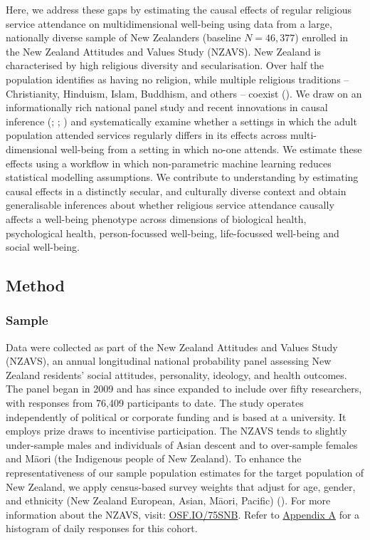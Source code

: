 \documentclass[
  single column]{article}
\begin{document}
Here, we address these gaps by estimating the causal effects of regular
religious service attendance on multidimensional well-being using data
from a large, nationally diverse sample of New Zealanders (baseline
\(N=46,377\)) enrolled in the New Zealand Attitudes and Values Study
(NZAVS). New Zealand is characterised by high religious diversity and
secularisation. Over half the population identifies as having no
religion, while multiple religious traditions -- Christianity, Hinduism,
Islam, Buddhism, and others -- coexist
(). We draw
on an informationally rich national panel study and recent innovations
in causal inference (;
;
) and systematically
examine whether a settings in which the adult population attended
services regularly differs in its effects across multi-dimensional
well-being from a setting in which no-one attends. We estimate these
effects using a workflow in which non-parametric machine learning
reduces statistical modelling assumptions. We contribute to
understanding by estimating causal effects in a distinctly secular, and
culturally diverse context and obtain generalisable inferences about
whether religious service attendance causally affects a well-being
phenotype across dimensions of biological health, psychological health,
person-focussed well-being, life-focussed well-being and social
well-being.

\subsection{Method}\label{method}

\subsubsection{Sample}\label{sample}

Data were collected as part of the New Zealand Attitudes and Values
Study (NZAVS), an annual longitudinal national probability panel
assessing New Zealand residents' social attitudes, personality,
ideology, and health outcomes. The panel began in 2009 and has since
expanded to include over fifty researchers, with responses from 76,409
participants to date. The study operates independently of political or
corporate funding and is based at a university. It employs prize draws
to incentivise participation. The NZAVS tends to slightly under-sample
males and individuals of Asian descent and to over-sample females and
Māori (the Indigenous people of New Zealand). To enhance the
representativeness of our sample population estimates for the target
population of New Zealand, we apply census-based survey weights that
adjust for age, gender, and ethnicity (New Zealand European, Asian,
Māori, Pacific) (). For more
information about the NZAVS, visit:
\href{https://doi.org/10.17605/OSF.IO/75SNB}{OSF.IO/75SNB}. Refer to
\hyperref[appendix-timeline]{Appendix A} for a histogram of daily
responses for this cohort.
\end{document}
